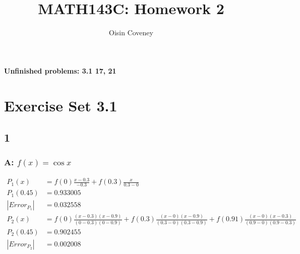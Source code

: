 \documentclass{oisinclass}
\title{MATH143C: Homework 2}
\author{Oisin Coveney}
\begin{document}
\maketitle

\textbf{Unfinished problems: 3.1 17, 21}

\section*{Exercise Set 3.1}
\subsection*{1}
\subsubsection*{A: \(f(x) = \cos{x}\)}
\begin{align*}
	P_1(x)                   & = f(0)\frac{x-0.3}{-0.3} + f(0.3)\frac{x}{0.3-0}                                                                                         \\
	P_1(0.45)                & = 0.933005                                                                                                                               \\
	\left|Error_{P_1}\right| & = 0.032558                                                                                                                               \\
	P_2(x)                   & = f(0)\frac{(x-0.3)(x-0.9)}{(0-0.3)(0-0.9)} + f(0.3)\frac{(x-0)(x-0.9)}{(0.3-0)(0.3-0.9)} + f(0.91)\frac{(x-0)(x-0.3)}{(0.9-0)(0.9-0.3)} \\
	P_2(0.45)                & = 0.902455                                                                                                                               \\
	\left|Error_{P_2}\right| & = 0.002008
\end{align*}
\end{document}
